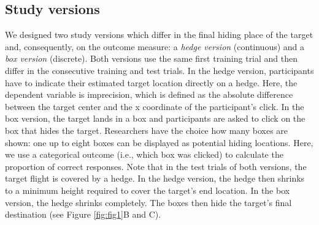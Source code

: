\documentclass[
  man,floatsintext]{apa6}
\begin{document}
\hypertarget{study-versions}{%
\subsection{Study versions}\label{study-versions}}

We designed two study versions which differ in the final hiding place of the target and, consequently, on the outcome measure: a \emph{hedge version} (continuous) and a \emph{box version} (discrete). Both versions use the same first training trial and then differ in the consecutive training and test trials.
In the hedge version, participants have to indicate their estimated target location directly on a hedge. Here, the dependent variable is imprecision, which is defined as the absolute difference between the target center and the x coordinate of the participant's click.
In the box version, the target lands in a box and participants are asked to click on the box that hides the target. Researchers have the choice how many boxes are shown: one up to eight boxes can be displayed as potential hiding locations. Here, we use a categorical outcome (i.e., which box was clicked) to calculate the proportion of correct responses.
Note that in the test trials of both versions, the target flight is covered by a hedge. In the hedge version, the hedge then shrinks to a minimum height required to cover the target's end location. In the box version, the hedge shrinks completely. The boxes then hide the target's final destination (see Figure \ref{fig:fig1}B and C).
\end{document}
